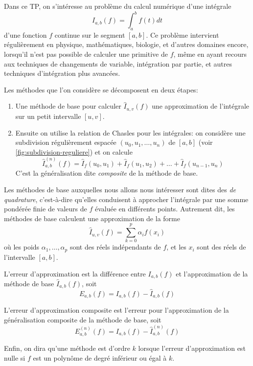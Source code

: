 

Dans ce TP, on s'intéresse au problème du calcul numérique d'une intégrale \[
    I_{a, b}(f) = \int_{a}^{b} f(t)dt
\]
d'une fonction $ f $ continue sur le segment $ [a, b] $. Ce problème intervient régulièrement en physique, mathématiques, biologie, et d'autres domaines encore, lorsqu'il n'est pas possible de calculer une primitive de $ f $, même en ayant recours aux techniques de changements de variable, intégration par partie, et autres techniques d'intégration plus avancées.

Les méthodes que l'on considère se décomposent en deux étapes:
\begin{enumerate}
    \item Une méthode de base pour calculer $ \hat{I}_{u, v}(f) $ une approximation de l'intégrale sur un petit intervalle $ [u, v] $.
    \item Ensuite on utilise la relation de Chasles pour les intégrales: on considère une subdivision régulièrement espacée $ (u_0, u_1, \ldots, u_n) $ de $ [a, b] $ (voir \autoref{fig:subdivision-reguliere}) et on calcule \[
        \hat{I}^{(n)}_{a, b}(f) = \hat{I}_f(u_0, u_1) + \hat{I}_f(u_1, u_2) + \ldots + \hat{I}_f(u_{n-1}, u_n)
    \]
    C'est la généralisation dite \textit{composite} de la méthode de base.
\end{enumerate}

Les méthodes de base auxquelles nous allons nous intéresser sont dites des \textit{de quadrature}, c'est-à-dire qu'elles conduisent à approcher l'intégrale par une somme pondérée finie de valeurs de $ f $ évaluée en différents points. Autrement dit, les méthodes de base calculent une approximation de la forme \[
    \hat{I}_{u, v}(f) = \sum_{k=0}^{p} \alpha_i f(x_i)
\]
où les poids $ \alpha_1, \ldots, \alpha_p $ sont des réels indépendants de $ f $, et les $ x_i $ sont des réels de l'intervalle $ [a, b] $.

L'erreur d'approximation est la différence entre $ I_{a, b}(f) $ et l'approximation de la méthode de base $ \hat{I}_{a, b}(f) $, soit \[
    E_{a, b}(f) =  I_{a, b}(f) -  \hat{I}_{a, b}(f) 
\]

L'erreur d'approximation composite est l'erreur pour l'approximation de la généralisation composite de la méthode de base, soit \[
    E^{(n)}_{a, b}(f) =  I_{a, b}(f) -  \hat{I}^{(n)}_{a, b}(f) 
\]


Enfin, on dira qu'une méthode \textrm{est d'ordre $ k $} lorsque l'erreur d'approximation est nulle si $ f $ est un polynôme de degré inférieur ou égal à $ k $.


